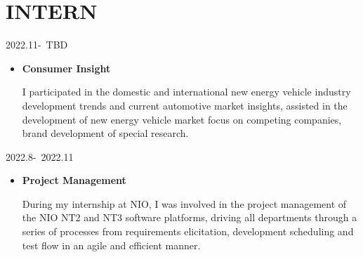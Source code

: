 \documentclass{resume}
\begin{document}

\section{INTERN}

{2022.11-\ TBD}
\begin{itemize}
  \item \textbf{Consumer Insight}\par I participated in the domestic and international new energy vehicle industry development trends and current automotive market insights, assisted in the development of new energy vehicle market focus on competing companies, brand development of special research.
\end{itemize}

{2022.8-\ 2022.11}
\begin{itemize}
  \item \textbf{Project Management}\par  During my internship at NIO, I was involved in the project management of the NIO NT2 and NT3 software platforms, driving all departments through a series of processes from requirements elicitation, development scheduling and test flow in an agile and efficient manner.
\end{itemize}


\end{document}
